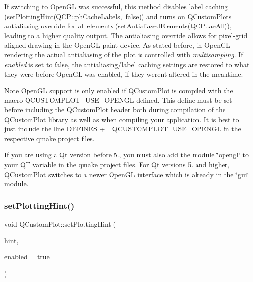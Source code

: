 If switching to Open\+GL was successful, this method disables label caching (\mbox{\hyperlink{class_q_custom_plot_a3b7c97bb6c16464e9e15190c07abe9a9}{set\+Plotting\+Hint(Q\+CP\+::ph\+Cache\+Labels, false)}}) and turns on \mbox{\hyperlink{class_q_custom_plot}{Q\+Custom\+Plot}}\textquotesingle{}s antialiasing override for all elements (\mbox{\hyperlink{class_q_custom_plot_af6f91e5eab1be85f67c556e98c3745e8}{set\+Antialiased\+Elements(Q\+CP\+::ae\+All)}}), leading to a higher quality output. The antialiasing override allows for pixel-\/grid aligned drawing in the Open\+GL paint device. As stated before, in Open\+GL rendering the actual antialiasing of the plot is controlled with {\itshape multisampling}. If {\itshape enabled} is set to false, the antialiasing/label caching settings are restored to what they were before Open\+GL was enabled, if they weren\textquotesingle{}t altered in the meantime.

\begin{DoxyNote}{Note}
Open\+GL support is only enabled if \mbox{\hyperlink{class_q_custom_plot}{Q\+Custom\+Plot}} is compiled with the macro {\ttfamily Q\+C\+U\+S\+T\+O\+M\+P\+L\+O\+T\+\_\+\+U\+S\+E\+\_\+\+O\+P\+E\+N\+GL} defined. This define must be set before including the \mbox{\hyperlink{class_q_custom_plot}{Q\+Custom\+Plot}} header both during compilation of the \mbox{\hyperlink{class_q_custom_plot}{Q\+Custom\+Plot}} library as well as when compiling your application. It is best to just include the line {\ttfamily D\+E\+F\+I\+N\+ES += Q\+C\+U\+S\+T\+O\+M\+P\+L\+O\+T\+\_\+\+U\+S\+E\+\_\+\+O\+P\+E\+N\+GL} in the respective qmake project files. 

If you are using a Qt version before 5., you must also add the module \char`\"{}opengl\char`\"{} to your {\ttfamily QT} variable in the qmake project files. For Qt versions 5. and higher, \mbox{\hyperlink{class_q_custom_plot}{Q\+Custom\+Plot}} switches to a newer Open\+GL interface which is already in the \char`\"{}gui\char`\"{} module. 
\end{DoxyNote}
\mbox{\label{class_q_custom_plot_a3b7c97bb6c16464e9e15190c07abe9a9}} 
\subsubsection{\texorpdfstring{setPlottingHint()}{setPlottingHint()}}
{\footnotesize\ttfamily void Q\+Custom\+Plot\+::set\+Plotting\+Hint (\begin{DoxyParamCaption}\item[{\mbox{\hyperlink{namespace_q_c_p_a5400e5fcb9528d92002ddb938c1f4ef4}{Q\+C\+P\+::\+Plotting\+Hint}}}]{hint,  }\item[{bool}]{enabled = {\ttfamily true} }\end{DoxyParamCaption})}

